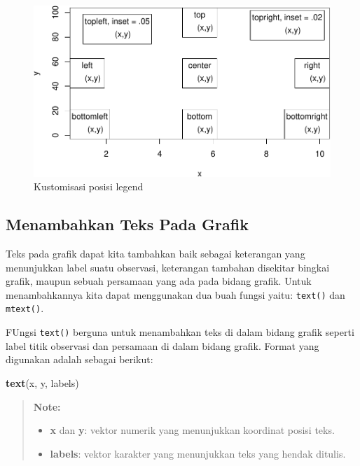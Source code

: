 \documentclass[]{book}
\newenvironment{Shaded}{\begin{snugshade}}{\end{snugshade}}
\newcommand{\KeywordTok}[1]{\textcolor[rgb]{0.13,0.29,0.53}{\textbf{#1}}}
\newcommand{\NormalTok}[1]{#1}
\providecommand{\tightlist}{%
  \setlength{\itemsep}{0pt}\setlength{\parskip}{0pt}}
\begin{document}
\begin{figure}

{\centering \includegraphics[width=0.7\linewidth]{EnvStat_files/figure-latex/legend4-1} 

}

\caption{Kustomisasi posisi legend}\label{fig:legend4}
\end{figure}

\subsection{Menambahkan Teks Pada
Grafik}\label{menambahkan-teks-pada-grafik}

Teks pada grafik dapat kita tambahkan baik sebagai keterangan yang
menunjukkan label suatu observasi, keterangan tambahan disekitar bingkai
grafik, maupun sebuah persamaan yang ada pada bidang grafik. Untuk
menambahkannya kita dapat menggunakan dua buah fungsi yaitu:
\texttt{text()} dan \texttt{mtext()}.

FUngsi \texttt{text()} berguna untuk menambahkan teks di dalam bidang
grafik seperti label titik observasi dan persamaan di dalam bidang
grafik. Format yang digunakan adalah sebagai berikut:

\begin{Shaded}
\begin{Highlighting}[]
\KeywordTok{text}\NormalTok{(x, y, labels)}
\end{Highlighting}
\end{Shaded}

\begin{quote}
\textbf{Note: }

\begin{itemize}
\tightlist
\item
  \textbf{x} dan \textbf{y}: vektor numerik yang menunjukkan koordinat
  posisi teks.
\item
  \textbf{labels}: vektor karakter yang menunjukkan teks yang hendak
  ditulis.
\end{itemize}
\end{quote}
\end{document}
